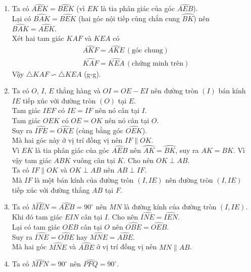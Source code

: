 \begin{ex}
{\begin{center}
  \end{center}
  \begin{enumerate}
   \item Ta có $\widehat{AEK} = \widehat{BEK}$ (vì $EK$ là tia phân giác của góc $\widehat{AEB}$).\\
   Lại có $\widehat{BAK} = \widehat{BEK}$ (hai góc nội tiếp cùng chắn cung $\wideparen{BK}$) nên $\widehat{BAK} = \widehat{AEK}$.\\
   Xét hai tam giác $KAF$ và $KEA$ có
   \begin{align*}
    & \widehat{AKF} = \widehat{AKE} \, (\text{góc chung})\\
    & \widehat{KAF} = \widehat{KEA} \, (\text{chứng minh trên})
   \end{align*}
   Vậy $\triangle KAF \backsim \triangle KEA$ (g-g).
   \item Ta có $O$, $I$, $E$ thẳng hàng và $OI = OE - EI$ nên đường tròn $(I)$ bán kính $IE$ tiếp xúc với đường tròn $(O)$ tại $E$.\\
   Tam giác $IEF$ có $IE = IF$ nên nó cân tại $I$.\\
   Tam giác $OEK$ có $OE = OK$ nên nó cân tại $O$.\\
   Suy ra $\widehat{IFE} = \widehat{OKE}$ (cùng bằng góc $\widehat{OEK}$).\\
   Mà hai góc này ở vị trí đồng vị nên $IF \parallel OK$.\\
   Vì $EK$ là tia phân giác của góc $\widehat{AEB}$ nên $\wideparen{AK} = \wideparen{BK}$, suy ra $AK = BK$. Vì vậy tam giác $ABK$ vuông cân tại $K$. Cho nên $OK \perp AB$.\\
   Ta có $IF \parallel OK$ và $OK \perp AB$ nên $AB \perp IF$.\\
   Mà $IF$ là một bán kính của đường tròn $(I,IE)$ nên đường tròn $(I,IE)$ tiếp xúc với đường thẳng $AB$ tại $F$.
   \item Ta có $\widehat{MEN} = \widehat{AEB} = 90^\circ$ nên $MN$ là đường kính của đường tròn $(I,IE)$. Khi đó tam giác $EIN$ cân tại $I$. Cho nên $\widehat{INE} = \widehat{IEN}$.\\
   Lại có tam giác $OEB$ cân tại $O$ nên $\widehat{OBE} = \widehat{OEB}$.\\
   Suy ra $\widehat{INE} = \widehat{OBE}$ hay $\widehat{MNE} = \widehat{ABE}$.\\
   Mà hai góc $\widehat{MNE}$ và $\widehat{ABE}$ ở vị trí đồng vị nên $MN \parallel AB$.
   \item Ta có $\widehat{MFN} = 90^\circ$ nên $\widehat{PFQ} = 90^\circ$.\\

\end{enumerate}}
\end{ex}
